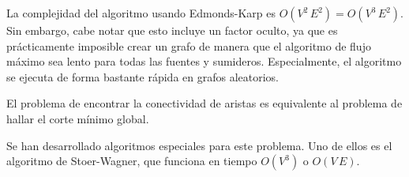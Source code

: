 \documentclass[a4paper]{article}
\begin{document}
La complejidad del algoritmo usando Edmonds-Karp es \(O(V^2 \, E^2) = O(V^3 \, E^2)\). Sin embargo, cabe notar que esto incluye un factor oculto, ya que es prácticamente imposible crear un grafo de manera que el algoritmo de flujo máximo sea lento para todas las fuentes y sumideros. Especialmente, el algoritmo se ejecuta de forma bastante rápida en grafos aleatorios.

El problema de encontrar la conectividad de aristas es equivalente al problema de hallar el corte mínimo global.

Se han desarrollado algoritmos especiales para este problema. Uno de ellos es el algoritmo de Stoer-Wagner, que funciona en tiempo \(O(V^3)\) o \(O(V \, E)\).
\end{document}
